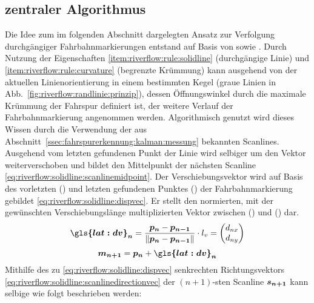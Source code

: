 \subsection{zentraler Algorithmus}
\label{sssec:fahrspurerkennung:riverflow:randlinie:zentraler_algorithmus}
Die Idee zum im folgenden Abschnitt dargelegten Ansatz zur Verfolgung durchgängiger Fahrbahnmarkierungen entstand auf Basis von \autocite{drauschkeEchtzeitfaehigeStartpunktalgorithmenFuer2016} sowie \autocite{limRiverFlowLane2012}.
Durch Nutzung der Eigenschaften \ref{item:riverflow:rule:solidline} (durchgängige Linie) und  \ref{item:riverflow:rule:curvature} (begrenzte Krümmung) kann ausgehend von der aktuellen Linienorientierung in einem bestimmten Kegel (graue Linien in Abb.~\ref{fig:riverflow:randlinie:prinzip}), dessen Öffnungswinkel durch die maximale Krümmung der Fahrspur definiert ist, der weitere Verlauf der Fahrbahnmarkierung angenommen werden.
Algorithmisch genutzt wird dieses Wissen durch die Verwendung der aus Abschnitt~\ref{ssec:fahrspurerkennung:kalman:messung} bekannten Scanlines.
Ausgehend vom letzten gefundenen Punkt der Linie  wird selbiger um den Vektor  weiterverschoben und bildet den Mittelpunkt   der nächsten Scanline \eqref{eq:riverflow:solidline:scanlinemidpoint}. Der Verschiebungsvektor  wird auf Basis des vorletzten () und letzten gefundenen Punktes () der Fahrbahnmarkierung gebildet \eqref{eq:riverflow:solidline:dispvec}. Er stellt den normierten, mit der gewünschten Verschiebungslänge  multiplizierten Vektor zwischen () und () dar.
\begin{equation}
\label{eq:riverflow:solidline:dispvec}
\vct{\gls{lat:dv}_n} =  \frac{\pnt{p_{n}} - \pnt{p_{n-1}}}{\nrm{\pnt{p_{n}} - \pnt{p_{n-1}}}} \cdot \scl{l_v}
= 
\begin{pmatrix}
\scl{d_{nx}} \\
\scl{d_{ny}}
\end{pmatrix}
\end{equation}
\begin{equation}
\label{eq:riverflow:solidline:scanlinemidpoint}
\pnt{m_{n+1}} =  \pnt{p_n} + \vct{\gls{lat:dv}_n}
\end{equation}
Mithilfe des zu  \eqref{eq:riverflow:solidline:dispvec} senkrechten Richtungsvektors  \eqref{eq:riverflow:solidline:scanlinedirectionvec} der \begin{math} (n+1)\end{math}-sten  Scanline \begin{math} \boldsymbol{s_{n+1}} \end{math} kann selbige wie folgt beschrieben werden:
